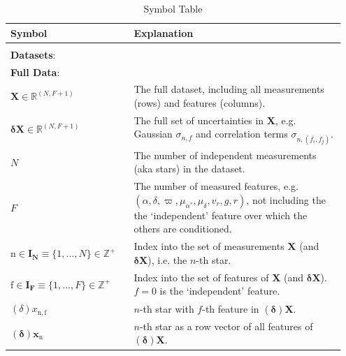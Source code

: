 \documentclass[twocolumn]{aastex631}
\newcommand{\mrm}[1]{\mathrm{#1}}
\newcommand{\mbs}[1]{\boldsymbol{#1}}
\newcommand{\mbf}[1]{\mathbf{#1}}
\newcommand{\mbb}[1]{\mathbb{#1}}
\newcommand{\nth}[1]{{#1}_{\mrm{n}}}  %
\begin{document}
    \begin{table}
    \centering
    \caption{Symbol Table}
    \label{table:symbol_table}
    \begin{tabular}{p{0.35\linewidth} p{0.6\linewidth}}
    Symbol                         & Explanation \\
    \toprule
    \\
    \multicolumn{2}{l}{\textbf{Datasets}:} \\
    \midrule
    \multicolumn{2}{l}{\textbf{Full Data}:}  \vspace{5pt} \\
    $\mbf{X} \in \mbb{R}^{(N, F+1)}$ & The full dataset, including all measurements (rows) and features (columns).  \\
    $\mbs{\delta}\mbf{X} \in \mbb{R}^{(N, F+1)}$ & The full set of uncertainties in $\mbf{X}$, e.g. Gaussian $\sigma_{n,f}$ and correlation terms $\sigma_{n,(f_i, f_j)}$.\\
    $N$ & The number of independent measurements (aka stars) in the dataset.  \\
    $F$ & The number of measured features, e.g. $(\alpha, \delta, \varpi, \mu_{\alpha^*}, \mu_\delta, v_r, g, r)$,  not including the the `independent' feature over which the others are conditioned. \\
    $\mrm{n} \in \mbs{I_N} \equiv \{1, ..., N\} \in \mbb{Z^+}$ & Index into the set of measurements $\mbf{X}$ (and $\mbs{\delta}\mbf{X}$), i.e. the $n$-th star. \\
    $\mrm{f} \in \mbs{I_F}  \equiv \{1, ..., F\} \in \mbb{Z^+}$ & Index into the set of features of $\mbf{X}$  (and $\mbs{\delta}\mbf{X}$). $ f=0$ is the `independent' feature.\\
    $(\delta)x_{\mrm{n,f}}$ & $n$-th star with $f$-th feature in $(\mbs{\delta})\mbf{X}$. \\
    $(\mbs{\delta})\nth{\mbs{x}}$ & $n$-th star as a row vector of all features of $(\mbs{\delta})\mbf{X}$. \\
    

\end{tabular}
\end{table}
\end{document}
